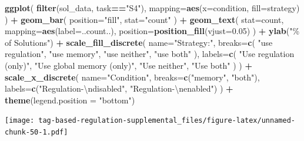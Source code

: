 \documentclass[
]{book}
\newenvironment{Shaded}{\begin{snugshade}}{\end{snugshade}}
\newcommand{\CharTok}[1]{\textcolor[rgb]{0.31,0.60,0.02}{#1}}
\newcommand{\DataTypeTok}[1]{\textcolor[rgb]{0.13,0.29,0.53}{#1}}
\newcommand{\FloatTok}[1]{\textcolor[rgb]{0.00,0.00,0.81}{#1}}
\newcommand{\KeywordTok}[1]{\textcolor[rgb]{0.13,0.29,0.53}{\textbf{#1}}}
\newcommand{\NormalTok}[1]{#1}
\newcommand{\OperatorTok}[1]{\textcolor[rgb]{0.81,0.36,0.00}{\textbf{#1}}}
\newcommand{\StringTok}[1]{\textcolor[rgb]{0.31,0.60,0.02}{#1}}
\begin{document}
\begin{Shaded}
\begin{Highlighting}[]
\KeywordTok{ggplot}\NormalTok{( }\KeywordTok{filter}\NormalTok{(sol\_data, task}\OperatorTok{==}\StringTok{"S4"}\NormalTok{), }\DataTypeTok{mapping=}\KeywordTok{aes}\NormalTok{(}\DataTypeTok{x=}\NormalTok{condition, }\DataTypeTok{fill=}\NormalTok{strategy) ) }\OperatorTok{+}
\StringTok{  }\KeywordTok{geom\_bar}\NormalTok{(}
    \DataTypeTok{position=}\StringTok{"fill"}\NormalTok{,}
    \DataTypeTok{stat=}\StringTok{"count"}
\NormalTok{  ) }\OperatorTok{+}
\StringTok{  }\KeywordTok{geom\_text}\NormalTok{(}
    \DataTypeTok{stat=}\StringTok{\textquotesingle{}count\textquotesingle{}}\NormalTok{,}
    \DataTypeTok{mapping=}\KeywordTok{aes}\NormalTok{(}\DataTypeTok{label=}\NormalTok{..count..),}
    \DataTypeTok{position=}\KeywordTok{position\_fill}\NormalTok{(}\DataTypeTok{vjust=}\FloatTok{0.05}\NormalTok{)}
\NormalTok{  ) }\OperatorTok{+}
\StringTok{  }\KeywordTok{ylab}\NormalTok{(}\StringTok{"\% of Solutions"}\NormalTok{) }\OperatorTok{+}
\StringTok{  }\KeywordTok{scale\_fill\_discrete}\NormalTok{(}
    \DataTypeTok{name=}\StringTok{"Strategy:"}\NormalTok{,}
    \DataTypeTok{breaks=}\KeywordTok{c}\NormalTok{(}
      \StringTok{"use regulation"}\NormalTok{,}
      \StringTok{"use memory"}\NormalTok{,}
      \StringTok{"use neither"}\NormalTok{,}
      \StringTok{"use both"}
\NormalTok{    ),}
    \DataTypeTok{labels=}\KeywordTok{c}\NormalTok{(}
      \StringTok{"Use regulation (only)"}\NormalTok{,}
      \StringTok{"Use global memory (only)"}\NormalTok{,}
      \StringTok{"Use neither"}\NormalTok{,}
      \StringTok{"Use both"}
\NormalTok{    )}
\NormalTok{  ) }\OperatorTok{+}
\StringTok{  }\KeywordTok{scale\_x\_discrete}\NormalTok{(}
    \DataTypeTok{name=}\StringTok{"Condition"}\NormalTok{,}
    \DataTypeTok{breaks=}\KeywordTok{c}\NormalTok{(}\StringTok{"memory"}\NormalTok{, }\StringTok{"both"}\NormalTok{),}
    \DataTypeTok{labels=}\KeywordTok{c}\NormalTok{(}\StringTok{"Regulation{-}}\CharTok{\textbackslash{}n}\StringTok{disabled"}\NormalTok{, }\StringTok{"Regulation{-}}\CharTok{\textbackslash{}n}\StringTok{enabled"}\NormalTok{)}
\NormalTok{  ) }\OperatorTok{+}
\StringTok{  }\KeywordTok{theme}\NormalTok{(}\DataTypeTok{legend.position =} \StringTok{"bottom"}\NormalTok{)}
\end{Highlighting}
\end{Shaded}

\texttt{[image: tag-based-regulation-supplemental\_files/figure-latex/unnamed-chunk-50-1.pdf]}
\end{document}
